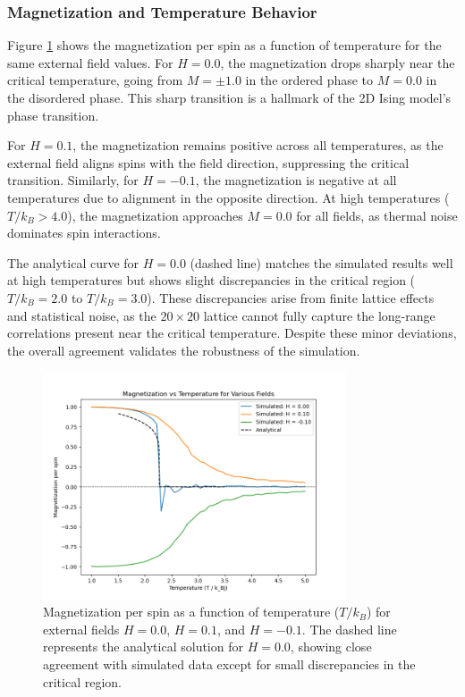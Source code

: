 \documentclass[11pt]{article}
\begin{document}
\subsubsection*{Magnetization and Temperature Behavior}
Figure \ref{fig:magnetization_vs_temp} shows the magnetization per spin as a function of temperature for the same external field values. For \(H = 0.0\), the magnetization drops sharply near the critical temperature, going from \(M = \pm 1.0\) in the ordered phase to \(M = 0.0\) in the disordered phase. This sharp transition is a hallmark of the 2D Ising model's phase transition.

For \(H = 0.1\), the magnetization remains positive across all temperatures, as the external field aligns spins with the field direction, suppressing the critical transition. Similarly, for \(H = -0.1\), the magnetization is negative at all temperatures due to alignment in the opposite direction. At high temperatures (\(T / k_B > 4.0\)), the magnetization approaches \(M = 0.0\) for all fields, as thermal noise dominates spin interactions.

The analytical curve for \(H = 0.0\) (dashed line) matches the simulated results well at high temperatures but shows slight discrepancies in the critical region (\(T / k_B = 2.0\) to \(T / k_B = 3.0\)). These discrepancies arise from finite lattice effects and statistical noise, as the \(20 \times 20\) lattice cannot fully capture the long-range correlations present near the critical temperature. Despite these minor deviations, the overall agreement validates the robustness of the simulation.

\begin{figure}[h!]
\centering
\includegraphics[width=0.8\textwidth]{Figs_Salar/heating_M-T_comparison.png}
\caption{Magnetization per spin as a function of temperature (\(T / k_B\)) for external fields \(H = 0.0\), \(H = 0.1\), and \(H = -0.1\). The dashed line represents the analytical solution for \(H = 0.0\), showing close agreement with simulated data except for small discrepancies in the critical region.}
\label{fig:magnetization_vs_temp}
\end{figure}
\end{document}
